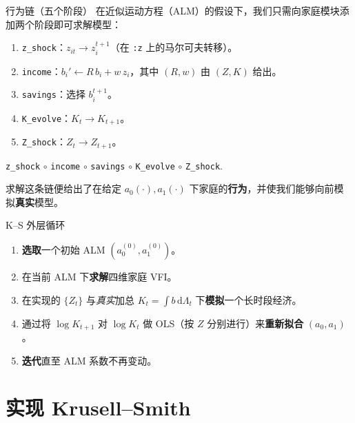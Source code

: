 \documentclass[10pt,aspectratio=169]{beamer}
\begin{document}
\begin{frame}{行为链（五个阶段）}
  在近似运动方程（ALM）的假设下，我们只需向家庭模块添加两个阶段即可求解模型：
  \begin{enumerate}
    \item \texttt{z\_shock}：$z_{it} \to z_i^{t+1}$（在 \texttt{:z} 上的马尔可夫转移）。
    \item \texttt{income}：$b_i' \gets R\, b_i + w\, z_i$，其中 $(R, w)$ 由 $(Z, K)$ 给出。
    \item \texttt{savings}：选择 $b_i^{t+1}$。
    \item \texttt{K\_evolve}：$K_t \to K_{t+1}$。
    \item \texttt{Z\_shock}：$Z_t \to Z_{t+1}$。
  \end{enumerate}

  \begin{center}\small
  \texttt{z\_shock} $\circ$ \texttt{income} $\circ$ \texttt{savings} $\circ$ \texttt{K\_evolve} $\circ$ \texttt{Z\_shock}.
  \end{center}

  求解这条链便给出了在给定 $a_0(\cdot), a_1(\cdot)$ 下家庭的\textbf{行为}，并使我们能够向前模拟\textbf{真实}模型。
\end{frame}

\begin{frame}{K--S 外层循环}
  \begin{enumerate}
    \item \textbf{选取}一个初始 ALM $(a_0^{(0)}, a_1^{(0)})$。
    \item 在当前 ALM 下\textbf{求解}四维家庭 VFI。
    \item 在实现的 $\{Z_t\}$ 与\emph{真实}加总 $K_t = \int b\, \mathrm d\Lambda_t$ 下\textbf{模拟}一个长时段经济。
    \item 通过将 $\log K_{t+1}$ 对 $\log K_t$ 做 OLS（按 $Z$ 分别进行）来\textbf{重新拟合} $(a_0, a_1)$。
    \item \textbf{迭代}直至 ALM 系数不再变动。
  \end{enumerate}
\end{frame}

\section{实现 Krusell--Smith}
\end{document}

